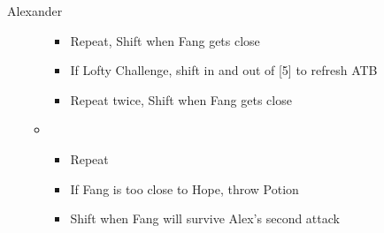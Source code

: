 \begin{battle}[1:29]{Alexander}
\begin{itemize}
\begin{itemize}
			            \begin{itemize}
				            \item Repeat, Shift when Fang gets close
				            \item If Lofty Challenge, shift in and out of [5] to refresh ATB
				            \item Repeat twice, Shift when Fang gets close
			            \end{itemize}
			      \item \first
			            \begin{itemize}
				            \item Repeat
				            \item If Fang is too close to Hope, throw Potion
				            \item Shift when Fang will survive Alex's second attack
			            \end{itemize}
		      \end{itemize}
	\end{itemize}
\end{battle}

